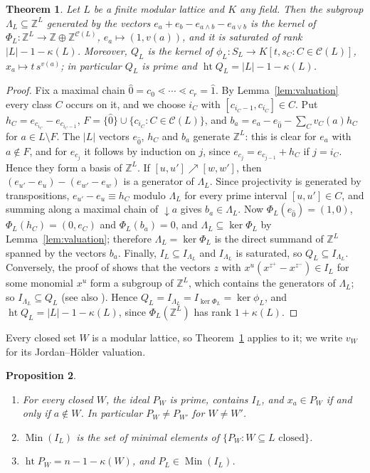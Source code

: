 \documentclass{amsart}
\newtheorem{theorem}{Theorem}[section]
\newtheorem{proposition}[theorem]{Proposition}
\theoremstyle{definition}
\DeclareMathOperator{\htop}{ht}
\DeclareMathOperator{\Min}{Min}
\newcommand{\cC}{\mathcal C}
\newcommand{\Z}{\mathbb Z}
\begin{document}
\begin{theorem}\label{thm:toric}
	Let $L$ be a finite modular lattice and $K$ any field. Then the subgroup $\Lambda_L\subseteq\Z^L$ generated by the vectors $e_a+e_b-e_{a\wedge b}-e_{a\vee b}$ is the kernel of $\Phi_L:\Z^L\to\Z\oplus\Z^{\cC(L)}$, $e_a\mapsto(1,v(a))$, and it is saturated of rank $|L|-1-\kappa(L)$. Moreover, $Q_L$ is the kernel of $\phi_L:S_L\to K[t,s_C : C\in\cC(L)]$, $x_a\mapsto t\,s^{v(a)}$; in particular $Q_L$ is prime and $\htop Q_L=|L|-1-\kappa(L)$.
\end{theorem}

\begin{proof}
	Fix a maximal chain $\hat0=c_0\lessdot\cdots\lessdot c_r=\hat1$. By Lemma~\ref{lem:valuation} every class $C$ occurs on it, and we choose $i_C$ with $[c_{i_C-1},c_{i_C}]\in C$. Put $h_C=e_{c_{i_C}}-e_{c_{i_C-1}}$, $F=\{\hat0\}\cup\{c_{i_C}:C\in\cC(L)\}$, and $b_a=e_a-e_{\hat0}-\sum_Cv_C(a)h_C$ for $a\in L\setminus F$. The $|L|$ vectors $e_{\hat0}$, $h_C$ and $b_a$ generate $\Z^L$: this is clear for $e_a$ with $a\notin F$, and for $e_{c_j}$ it follows by induction on $j$, since $e_{c_j}=e_{c_{j-1}}+h_C$ if $j=i_C$. Hence they form a basis of $\Z^L$. If $[u,u']\nearrow[w,w']$, then $(e_{u'}-e_u)-(e_{w'}-e_w)$ is a generator of $\Lambda_L$. Since projectivity is generated by transpositions, $e_{u'}-e_u\equiv h_C$ modulo $\Lambda_L$ for every prime interval $[u,u']\in C$, and summing along a maximal chain of ${\downarrow}a$ gives $b_a\in\Lambda_L$. Now $\Phi_L(e_{\hat0})=(1,0)$, $\Phi_L(h_C)=(0,e_C)$ and $\Phi_L(b_a)=0$, and $\Lambda_L\subseteq\ker\Phi_L$ by Lemma~\ref{lem:valuation}; therefore $\Lambda_L=\ker\Phi_L$ is the direct summand of $\Z^L$ spanned by the vectors $b_a$. Finally, $I_L\subseteq I_{\Lambda_L}$ and $I_{\Lambda_L}$ is saturated, so $Q_L\subseteq I_{\Lambda_L}$. Conversely, the proof of \cite[Theorem 3.19]{HHO} shows that the vectors $z$ with $x^u(x^{z^+}-x^{z^-})\in I_L$ for some monomial $x^u$ form a subgroup of $\Z^L$, which contains the generators of $\Lambda_L$; so $I_{\Lambda_L}\subseteq Q_L$ (see also \cite[Corollary 2.5]{ES}). Hence $Q_L=I_{\Lambda_L}=I_{\ker\Phi_L}=\ker\phi_L$, and $\htop Q_L=|L|-1-\kappa(L)$, since $\Phi_L(\Z^L)$ has rank $1+\kappa(L)$.
\end{proof}

Every closed set $W$ is a modular lattice, so Theorem~\ref{thm:toric} applies to it; we write $v_W$ for its Jordan--H\"older valuation.

\begin{proposition}\label{prop:minprimes}
\begin{enumerate}
\item[(a)] For every closed $W$, the ideal $P_W$ is prime, contains $I_L$, and $x_a\in P_W$ if and only if $a\notin W$. In particular $P_W\ne P_{W'}$ for $W\ne W'$.
\item[(b)] $\Min(I_L)$ is the set of minimal elements of $\{P_W : W\subseteq L\text{ closed}\}$.
\item[(c)] $\htop P_W=n-1-\kappa(W)$, and $P_L\in\Min(I_L)$.
\end{enumerate}
\end{proposition}
\end{document}
